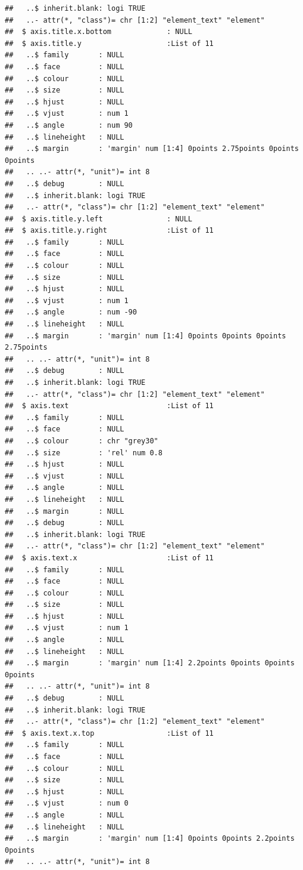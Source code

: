 \documentclass[
  12pt,
]{article}
\begin{document}
\begin{verbatim}
##   ..$ inherit.blank: logi TRUE
##   ..- attr(*, "class")= chr [1:2] "element_text" "element"
##  $ axis.title.x.bottom             : NULL
##  $ axis.title.y                    :List of 11
##   ..$ family       : NULL
##   ..$ face         : NULL
##   ..$ colour       : NULL
##   ..$ size         : NULL
##   ..$ hjust        : NULL
##   ..$ vjust        : num 1
##   ..$ angle        : num 90
##   ..$ lineheight   : NULL
##   ..$ margin       : 'margin' num [1:4] 0points 2.75points 0points 0points
##   .. ..- attr(*, "unit")= int 8
##   ..$ debug        : NULL
##   ..$ inherit.blank: logi TRUE
##   ..- attr(*, "class")= chr [1:2] "element_text" "element"
##  $ axis.title.y.left               : NULL
##  $ axis.title.y.right              :List of 11
##   ..$ family       : NULL
##   ..$ face         : NULL
##   ..$ colour       : NULL
##   ..$ size         : NULL
##   ..$ hjust        : NULL
##   ..$ vjust        : num 1
##   ..$ angle        : num -90
##   ..$ lineheight   : NULL
##   ..$ margin       : 'margin' num [1:4] 0points 0points 0points 2.75points
##   .. ..- attr(*, "unit")= int 8
##   ..$ debug        : NULL
##   ..$ inherit.blank: logi TRUE
##   ..- attr(*, "class")= chr [1:2] "element_text" "element"
##  $ axis.text                       :List of 11
##   ..$ family       : NULL
##   ..$ face         : NULL
##   ..$ colour       : chr "grey30"
##   ..$ size         : 'rel' num 0.8
##   ..$ hjust        : NULL
##   ..$ vjust        : NULL
##   ..$ angle        : NULL
##   ..$ lineheight   : NULL
##   ..$ margin       : NULL
##   ..$ debug        : NULL
##   ..$ inherit.blank: logi TRUE
##   ..- attr(*, "class")= chr [1:2] "element_text" "element"
##  $ axis.text.x                     :List of 11
##   ..$ family       : NULL
##   ..$ face         : NULL
##   ..$ colour       : NULL
##   ..$ size         : NULL
##   ..$ hjust        : NULL
##   ..$ vjust        : num 1
##   ..$ angle        : NULL
##   ..$ lineheight   : NULL
##   ..$ margin       : 'margin' num [1:4] 2.2points 0points 0points 0points
##   .. ..- attr(*, "unit")= int 8
##   ..$ debug        : NULL
##   ..$ inherit.blank: logi TRUE
##   ..- attr(*, "class")= chr [1:2] "element_text" "element"
##  $ axis.text.x.top                 :List of 11
##   ..$ family       : NULL
##   ..$ face         : NULL
##   ..$ colour       : NULL
##   ..$ size         : NULL
##   ..$ hjust        : NULL
##   ..$ vjust        : num 0
##   ..$ angle        : NULL
##   ..$ lineheight   : NULL
##   ..$ margin       : 'margin' num [1:4] 0points 0points 2.2points 0points
##   .. ..- attr(*, "unit")= int 8

\end{verbatim}
\end{document}
